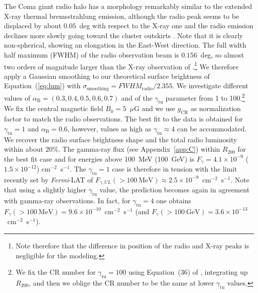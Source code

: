 \documentclass[traditabstract]{aa}
\newcommand{\rmn}{\mathrm}
\begin{document}
The Coma giant radio halo has a morphology remarkably similar to the extended X-ray thermal bremsstrahlung emission, although the radio peak seems to be displaced by about $0.05$~deg with respect to the X-ray one and the radio emission declines more slowly going toward the cluster outskirts \citep{1992A&A...259L..31B,1997A&A...321...55D}. Note that it is clearly non-spherical, showing an elongation in the East-West direction. The full width half maximum (FWHM) of the \cite{1997A&A...321...55D} radio observation beam is $0.156$~deg, so almost two orders of magnitude larger than the X-ray observation of \cite{1992A&A...259L..31B}.\footnote[12]{Note therefore that the difference in position of the radio and X-ray peaks is negligible for the modeling.}
We therefore apply a Gaussian smoothing to our theoretical surface brightness of Equation~(\ref{eq:lum}) with $\sigma_{\rmn{smoothing}} = FWHM_{\rmn{radio}}/2.355$. 
We investigate different values of $\alpha_{\rmn{B}}=(0.3,0.4,0.5,0.6,0.7)$ and of the $\gamma_{\rmn{tu}}$ parameter from 1 to 100.\footnote[13]{We fix the CR number for $\gamma_{\rmn{tu}}=100$ using Equation~(36) of \cite{2011A&A...527A..99E}, integrating up $R_{200}$, and then we oblige the CR number to be the same at lower $\gamma_{\rmn{tu}}$ values.} We fix the central magnetic field $B_{0}=5$~$\mu$G \citep{2010A&A...513A..30B} and we use $g_{\rmn{CR}}$ as normalization factor to match the radio observations. The best fit to the data is obtained for $\gamma_{\rmn{tu}}=1$ and $\alpha_{\rmn{B}}=0.6$, however, values as high as $\gamma_{\rmn{tu}} \approx 4$ can be accommodated. We recover the radio surface brightness shape and the total radio luminosity within about $20\%$. The gamma-ray flux (see Appendix~\ref{app:C}) within $R_{200}$ for the best fit case and for energies above 100~MeV (100~GeV) is $F_{\gamma} = 4.1 \times 10^{-9}$ ($1.5 \times 10^{-12}$) cm$^{-2}$~s$^{-1}$. The $\gamma_{\rmn{tu}} = 1$ case is therefore in tension with the limit recently set by \emph{Fermi}-LAT \citep{2012AAS...21920701Z} of $F_{\gamma, UL} (>100~\rmn{MeV}) \approx 2.5 \times 10^{-9}$~cm$^{-2}$~s$^{-1}$. Note that using a slightly higher $\gamma_{\rmn{tu}}$ value, the prediction becomes again in agreement with gamma-ray observations. In fact, for $\gamma_{\rmn{tu}} = 4$ one obtains $F_{\gamma} (>100~\rmn{MeV}) = 9.6 \times 10^{-10}$~cm$^{-2}$~s$^{-1}$ (and $F_{\gamma} (>100~\rmn{GeV}) = 3.6 \times 10^{-13}$~cm$^{-2}$~s$^{-1}$). 
\end{document}
